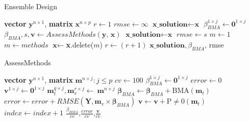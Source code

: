 \documentclass[12pt]{article}
\newcommand{\+}[1]{\ensuremath{\mathbf{#1}}}
\begin{document}
\begin{table}[t]
\begin{minipage}[t]{0.45\linewidth}\centering
\begin{algorithm}[H]
\footnotesize
\caption{\newline Ensemble Design} 
\label{Method:Alg1} 
\begin{algorithmic}[1]
{\scriptsize
\REQUIRE \textbf{vector} $\textbf{y}^{n \times 1}$, \textbf{matrix} $\textbf{x}^{n \times p}$\;
\vspace{2.5mm}
\STATE $r \leftarrow 1$\;
\STATE $rmse \leftarrow \infty$\;
\STATE $\textbf{x\_solution} \leftarrow \textbf{x}$\;
\STATE $\beta_{BMA}^{1 \times j} \leftarrow \textbf{0}^{1 \times j}$\;
\;
\STATE $\beta_{BMA}, s, \textbf{v} \leftarrow Assess Methods(\textbf{y, x})$\;
\;
\STATE $\textbf{x\_solution} \leftarrow \textbf{x}$\;
\STATE $rmse \leftarrow s$\;
\ENDIF\;
\STATE $m \leftarrow 1$\;
\;
\;
\STATE $m \leftarrow methods$\;
\ENDIF\;
\ENDFOR\;
\STATE $\textbf{x} \leftarrow $\textbf{x}.delete($m$) \;
\STATE $r\leftarrow (r + 1)$\;
\ENDWHILE\;
\RETURN $\textbf{x\_solution},\beta_{BMA}$, rmse\; 
}
\end{algorithmic}
\end{algorithm}
\end{minipage}
\hspace{0.5cm}
\begin{minipage}[t]{0.45\linewidth}
\centering

\begin{algorithm}[H]
\footnotesize
\caption{\newline AssessMethods } 
\label{Method:Alg2} 
\begin{algorithmic}[1]
{\scriptsize
\REQUIRE  \textbf{vector} $\textbf{y}^{n \times 1}$, \textbf{matrix} $\textbf{m}^{n \times j}: j \leq p$\; 
\vspace{2.5mm}
\STATE $cv \leftarrow 100$\;
\;
\STATE $\beta_{BMA}^{1 \times j} \leftarrow \textbf{0}^{1 \times j}$\;
\STATE $error \leftarrow 0$\;
\STATE $\textbf{v}^{1 \times j} \leftarrow \textbf{0}^{1 \times j}$\;
\;
\STATE $\textbf{m}_{t}^{q \times j}, \textbf{m}_{v}^{r \times j} \leftarrow\ \textbf{m}^{n \times j}$\; 
\;
\STATE $\boldsymbol{\beta}_{BMA} \leftarrow \boldsymbol{\beta}_{BMA} + $BMA$(\textbf{m}_{t})$ \;
\STATE $error \leftarrow error + RMSE(\textbf{Y}, \textbf{m}_{v} \times \boldsymbol{\beta}_{BMA})$\;
\STATE $\textbf{v} \leftarrow \textbf{v} + $P$\neq$0$(\textbf{m}_{t})$ \;
\STATE $index \leftarrow index + 1$
\ENDWHILE\;
\RETURN $\frac{\beta_{BMA}}{cv}$,$\frac{error}{cv}$,$\frac{\textbf{v}}{cv}$\;
}
\end{algorithmic}
\end{algorithm}
\end{minipage}
\end{table}
\end{document}
